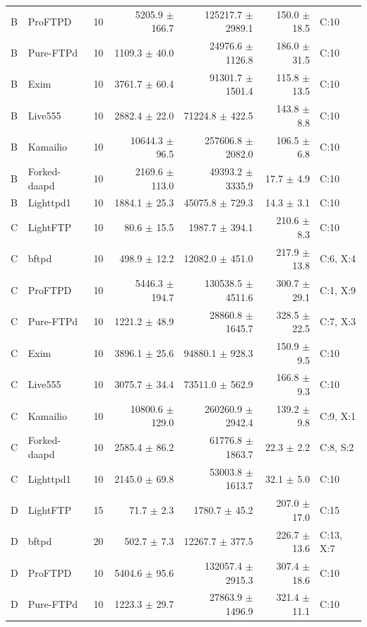 \begin{longtable}{@{}llrrrrl@{}}
B & ProFTPD & 10 & 5205.9 $\pm$ 166.7 & 125217.7 $\pm$ 2989.1 & 150.0 $\pm$ 18.5 & C:10 \\
B & Pure-FTPd & 10 & 1109.3 $\pm$ 40.0 & 24976.6 $\pm$ 1126.8 & 186.0 $\pm$ 31.5 & C:10 \\
B & Exim & 10 & 3761.7 $\pm$ 60.4 & 91301.7 $\pm$ 1501.4 & 115.8 $\pm$ 13.5 & C:10 \\
B & Live555 & 10 & 2882.4 $\pm$ 22.0 & 71224.8 $\pm$ 422.5 & 143.8 $\pm$ 8.8 & C:10 \\
B & Kamailio & 10 & 10644.3 $\pm$ 96.5 & 257606.8 $\pm$ 2082.0 & 106.5 $\pm$ 6.8 & C:10 \\
B & Forked-daapd & 10 & 2169.6 $\pm$ 113.0 & 49393.2 $\pm$ 3335.9 & 17.7 $\pm$ 4.9 & C:10 \\
B & Lighttpd1 & 10 & 1884.1 $\pm$ 25.3 & 45075.8 $\pm$ 729.3 & 14.3 $\pm$ 3.1 & C:10 \\
\addlinespace[3pt]
C & LightFTP & 10 & 80.6 $\pm$ 15.5 & 1987.7 $\pm$ 394.1 & 210.6 $\pm$ 8.3 & C:10 \\
C & bftpd & 10 & 498.9 $\pm$ 12.2 & 12082.0 $\pm$ 451.0 & 217.9 $\pm$ 13.8 & C:6, X:4 \\
C & ProFTPD & 10 & 5446.3 $\pm$ 194.7 & 130538.5 $\pm$ 4511.6 & 300.7 $\pm$ 29.1 & C:1, X:9 \\
C & Pure-FTPd & 10 & 1221.2 $\pm$ 48.9 & 28860.8 $\pm$ 1645.7 & 328.5 $\pm$ 22.5 & C:7, X:3 \\
C & Exim & 10 & 3896.1 $\pm$ 25.6 & 94880.1 $\pm$ 928.3 & 150.9 $\pm$ 9.5 & C:10 \\
C & Live555 & 10 & 3075.7 $\pm$ 34.4 & 73511.0 $\pm$ 562.9 & 166.8 $\pm$ 9.3 & C:10 \\
C & Kamailio & 10 & 10800.6 $\pm$ 129.0 & 260260.9 $\pm$ 2942.4 & 139.2 $\pm$ 9.8 & C:9, X:1 \\
C & Forked-daapd & 10 & 2585.4 $\pm$ 86.2 & 61776.8 $\pm$ 1863.7 & 22.3 $\pm$ 2.2 & C:8, S:2 \\
C & Lighttpd1 & 10 & 2145.0 $\pm$ 69.8 & 53003.8 $\pm$ 1613.7 & 32.1 $\pm$ 5.0 & C:10 \\
\addlinespace[3pt]
D & LightFTP & 15 & 71.7 $\pm$ 2.3 & 1780.7 $\pm$ 45.2 & 207.0 $\pm$ 17.0 & C:15 \\
D & bftpd & 20 & 502.7 $\pm$ 7.3 & 12267.7 $\pm$ 377.5 & 226.7 $\pm$ 13.6 & C:13, X:7 \\
D & ProFTPD & 10 & 5404.6 $\pm$ 95.6 & 132057.4 $\pm$ 2915.3 & 307.4 $\pm$ 18.6 & C:10 \\
D & Pure-FTPd & 10 & 1223.3 $\pm$ 29.7 & 27863.9 $\pm$ 1496.9 & 321.4 $\pm$ 11.1 & C:10 \\

\end{longtable}
